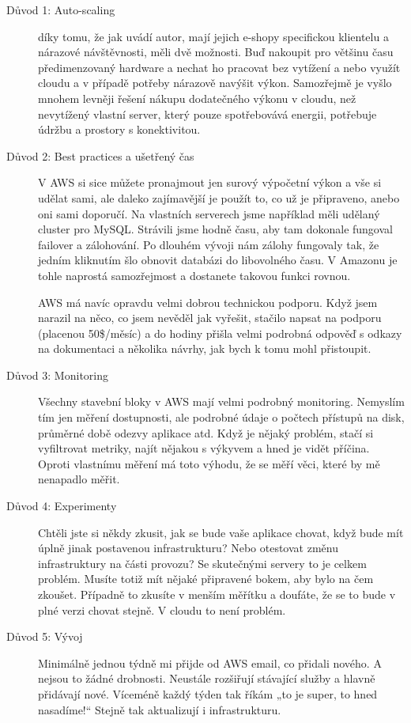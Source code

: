 \begin{description}
	\item [Důvod 1: Auto-scaling] díky tomu, že jak uvádí autor, mají jejich e-shopy specifickou klientelu a nárazové návštěvnosti, měli dvě možnosti. Buď nakoupit pro většinu času předimenzovaný hardware a nechat ho pracovat bez vytížení a nebo využít cloudu a v případě potřeby nárazově navýšit výkon. Samozřejmě je vyšlo mnohem levněji řešení nákupu dodatečného výkonu v cloudu, než nevytížený vlastní server, který pouze spotřebovává energii, potřebuje údržbu a prostory s konektivitou.
	\item [Důvod 2: Best practices a ušetřený čas] V AWS si sice můžete pronajmout jen surový výpočetní výkon a vše si udělat sami, ale daleko zajímavější je použít to, co už je připraveno, anebo oni sami doporučí. Na vlastních serverech jsme například měli udělaný cluster pro MySQL. Strávili jsme hodně času, aby tam dokonale fungoval failover a zálohování. Po dlouhém vývoji nám zálohy fungovaly tak, že jedním kliknutím šlo obnovit databázi do libovolného času. V Amazonu je tohle naprostá samozřejmost a dostanete takovou funkci rovnou.

AWS má navíc opravdu velmi dobrou technickou podporu. Když jsem narazil na něco, co jsem nevěděl jak vyřešit, stačilo napsat na podporu (placenou 50\$/měsíc) a do hodiny přišla velmi podrobná odpověď s odkazy na dokumentaci a několika návrhy, jak bych k tomu mohl přistoupit.\cite{souki:procMigrovat}
	\item [Důvod 3: Monitoring] Všechny stavební bloky v AWS mají velmi podrobný monitoring. Nemyslím tím jen měření dostupnosti, ale podrobné údaje o počtech přístupů na disk, průměrné době odezvy aplikace atd. Když je nějaký problém, stačí si vyfiltrovat metriky, najít nějakou s výkyvem a hned je vidět příčina. Oproti vlastnímu měření má toto výhodu, že se měří věci, které by mě nenapadlo měřit.\cite{souki:procMigrovat}
	\item [Důvod 4: Experimenty] Chtěli jste si někdy zkusit, jak se bude vaše aplikace chovat, když bude mít úplně jinak postavenou infrastrukturu? Nebo otestovat změnu infrastruktury na části provozu? Se skutečnými servery to je celkem problém. Musíte totiž mít nějaké připravené bokem, aby bylo na čem zkoušet. Případně to zkusíte v menším měřítku a doufáte, že se to bude v plné verzi chovat stejně. V cloudu to není problém.\cite{souki:procMigrovat}
	\item [Důvod 5: Vývoj] Minimálně jednou týdně mi přijde od AWS email, co přidali nového. A nejsou to žádné drobnosti. Neustále rozšiřují stávající služby a hlavně přidávají nové. Víceméně každý týden tak říkám „to je super, to hned nasadíme!“ Stejně tak aktualizují i infrastrukturu.\cite{souki:procMigrovat}
\end{description}
